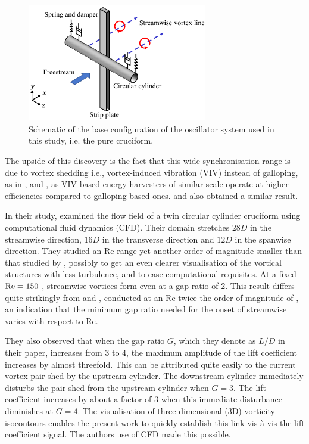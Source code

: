 \documentclass[oneside]{utmthesis}
\begin{document}
\begin{figure}[!h]
  \centering
  \hspace{1cm} \includegraphics[width=0.7\textwidth]{figs/oscillatorSchematic}
  \caption{Schematic of the base configuration of the oscillator system used in this study, i.e. the pure cruciform.}
  \label{fig:oscillatorSchematic}
\end{figure}

The upside of this discovery is the fact that this wide synchronisation range is due to vortex shedding i.e., vortex-induced vibration (VIV) instead of galloping, as in \citet{Sun2019b}, \citet{Xu2019} and \citet{Ding2019}, as VIV-based energy harvesters of similar scale operate at higher efficiencies compared to galloping-based ones. \citet{Sun2016} and \citet{Ma2016} also obtained a similar result.

In their study, \citet{Deng2007} examined the flow field of a twin circular cylinder cruciform using computational fluid dynamics (CFD). Their domain stretches  $28D$  in the streamwise direction,  $16D$  in the transverse direction and  $12D$  in the spanwise direction. They studied an Re range yet another order of magnitude smaller than that studied by \citet{Koide2017}, possibly to get an even clearer visualisation of the vortical structures with less turbulence, and to ease computational requisites. At a fixed  $\text{Re} = 150$ , streamwise vortices form even at a gap ratio of $2$. This result differs quite strikingly from \citet{Koide2006} and \citet{Koide2007}, conducted at an Re twice the order of magnitude of \citet{Deng2007}, an indication that the minimum gap ratio needed for the onset of streamwise varies with respect to Re.

They also observed that when the gap ratio $G$, which they denote as  $L/D$  in their paper, increases from 3 to 4, the maximum amplitude of the lift coefficient increases by almost threefold. This can be attributed quite easily to the current vortex pair shed by the upstream cylinder. The downstream cylinder immediately disturbs the pair shed from the upstream cylinder when  $G=3$. The lift coefficient increases by about a factor of 3 when this immediate disturbance diminishes at  $G=4$. The visualisation of three-dimensional (3D) vorticity isocontours enables the present work to quickly establish this link vis-\`{a}-vis the lift coefficient signal. The authors use of CFD made this possible.
\end{document}
